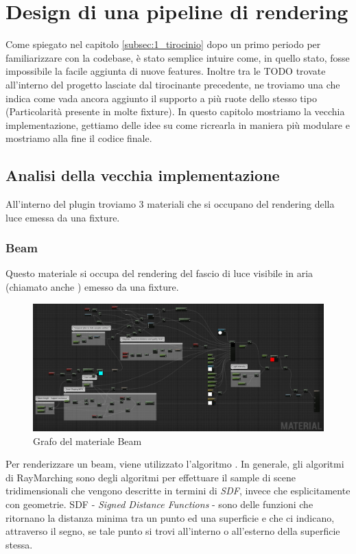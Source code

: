 \documentclass[main.tex]{subfiles}
\begin{document}
\sloppy


\vspace{1.0cm}

\section{Design di una pipeline di rendering}\label{sec:RenderingPipeline}
Come spiegato nel capitolo \ref{subsec:1_tirocinio} dopo un primo periodo per familiarizzare con la codebase, è stato semplice intuire come, in quello stato, fosse impossibile la facile aggiunta di nuove features. Inoltre tra le TODO trovate all'interno del progetto lasciate dal tirocinante precedente, ne troviamo una che indica come vada ancora aggiunto il supporto a più ruote dello stesso tipo (Particolarità presente in molte fixture). In questo capitolo mostriamo la vecchia implementazione, gettiamo delle idee su come ricrearla in maniera più modulare e mostriamo alla fine il codice finale.

\subsection{Analisi della vecchia implementazione}\label{subsec:2_oldImplementation}
All'interno del plugin troviamo 3 materiali che si occupano del rendering della luce emessa da una fixture.
\subsubsection{Beam}\label{subsec:2_1_beam}
Questo materiale si occupa del rendering del fascio di luce visibile in aria (chiamato anche ) emesso da una fixture.
\begin{figure}[H]
    \centering
    \includegraphics[width=1\linewidth]{img/renderingPipeline/BeamMaterialFull.jpg}
    \caption{Grafo del materiale Beam}
    \label{fig:2_beamGraphFull}
\end{figure}
Per renderizzare un beam, viene utilizzato l'algoritmo . In generale, gli algoritmi di RayMarching \cite{RayMarching} sono degli algoritmi per effettuare il sample di scene tridimensionali che vengono descritte in termini di \textit{SDF}, invece che esplicitamente con geometrie. SDF - \textit{Signed Distance Functions} - sono delle funzioni che ritornano la distanza minima tra un punto ed una superficie e che ci indicano, attraverso il segno, se tale punto si trovi all'interno o all'esterno della superficie stessa.\newline
\end{document}
